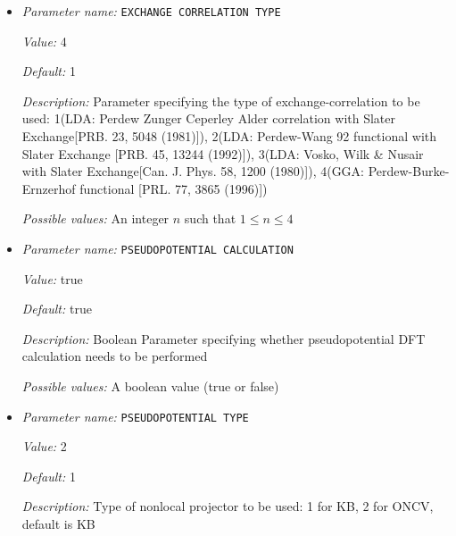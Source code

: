 \begin{itemize}
\item {\it Parameter name:} {\tt EXCHANGE CORRELATION TYPE}
\label{parameters:DFT functional related parameters/EXCHANGE CORRELATION TYPE}
\label{parameters:DFT_20functional_20related_20parameters/EXCHANGE_20CORRELATION_20TYPE}


{\it Value:} 4


{\it Default:} 1


{\it Description:} Parameter specifying the type of exchange-correlation to be used: 1(LDA: Perdew Zunger Ceperley Alder correlation with Slater Exchange[PRB. 23, 5048 (1981)]), 2(LDA: Perdew-Wang 92 functional with Slater Exchange [PRB. 45, 13244 (1992)]), 3(LDA: Vosko, Wilk \& Nusair with Slater Exchange[Can. J. Phys. 58, 1200 (1980)]), 4(GGA: Perdew-Burke-Ernzerhof functional [PRL. 77, 3865 (1996)])


{\it Possible values:} An integer $n$ such that $1\leq n \leq 4$
\item {\it Parameter name:} {\tt PSEUDOPOTENTIAL CALCULATION}
\label{parameters:DFT functional related parameters/PSEUDOPOTENTIAL CALCULATION}
\label{parameters:DFT_20functional_20related_20parameters/PSEUDOPOTENTIAL_20CALCULATION}


{\it Value:} true


{\it Default:} true


{\it Description:} Boolean Parameter specifying whether pseudopotential DFT calculation needs to be performed


{\it Possible values:} A boolean value (true or false)
\item {\it Parameter name:} {\tt PSEUDOPOTENTIAL TYPE}
\label{parameters:DFT functional related parameters/PSEUDOPOTENTIAL TYPE}
\label{parameters:DFT_20functional_20related_20parameters/PSEUDOPOTENTIAL_20TYPE}


{\it Value:} 2


{\it Default:} 1


{\it Description:} Type of nonlocal projector to be used: 1 for KB, 2 for ONCV, default is KB



\end{itemize}

